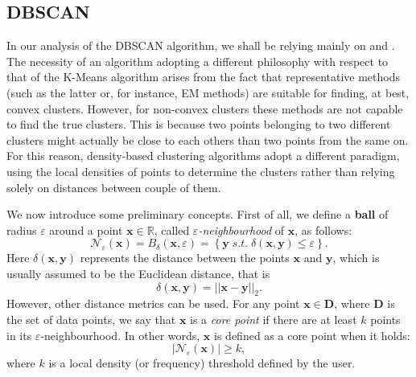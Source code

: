 \documentclass[a4paper]{article}
\begin{document}
	\subsection{DBSCAN}
	In our analysis of the DBSCAN algorithm, we shall be relying mainly on \cite{Ester96adensity-based} and \cite{zaki2014dataminingbook}. The necessity of an algorithm adopting a different philosophy with respect to that of the K-Means algorithm arises from the fact that representative methods (such as the latter or, for instance, EM methods) are suitable for finding, at best, convex clusters.
	However, for non-convex clusters these methods are not capable to find the true clusters. This is because two points belonging to two different clusters might actually be close to each others than two points from the same on.
	For this reason, density-based clustering algorithms adopt a different paradigm, using the local densities of points to determine the clusters rather than relying solely on distances between couple of them.
	
	We now introduce some preliminary concepts. First of all, we define a \textbf{ball} of radius $\varepsilon$ around a point $\boldsymbol{x} \in \mathbb{R}$, called \textit{$\varepsilon$-neighbourhood} of $\boldsymbol{x}$, as follows:
	\begin{equation*}
	\mathcal{N}_{\varepsilon} (\boldsymbol{x}) = B_{\delta}\left( \boldsymbol{x}, \varepsilon \right) = \left\{ \boldsymbol{y} \; s.t. \; \delta \left( \boldsymbol{x}, \boldsymbol{y} \right) \leq \varepsilon \right\}.
	\end{equation*}
	Here $\delta \left( \boldsymbol{x}, \boldsymbol{y} \right)$ represents the distance between the points $\boldsymbol{x}$ and $\boldsymbol{y}$, which is usually assumed to be the Euclidean distance, that is
	\begin{equation*}
	\delta(\boldsymbol{x}, \boldsymbol{y}) = || \boldsymbol{x} - \boldsymbol{y} ||_{2}.
	\end{equation*}
	However, other distance metrics can be used.
	For any point $\boldsymbol{x} \in \boldsymbol{D}$, where $\boldsymbol{D}$ is the set of data points, we say that $\boldsymbol{x}$ is a \textit{core point} if there are at least $k$ points in its $\varepsilon$-neighbourhood.
	In other words, $\boldsymbol{x}$ is defined as a core point when it holds:
	\begin{equation*}
	| \mathcal{N}_{\varepsilon}(\boldsymbol{x})| \geq k,
	\end{equation*}
	where $k$ is a local density (or frequency) threshold defined by the user.
	
\end{document}
